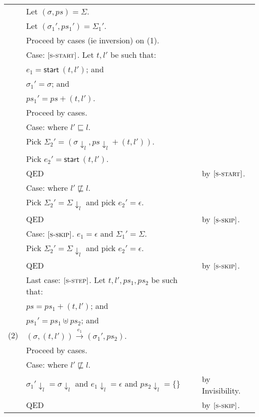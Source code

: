 \documentclass{article}
\newcommand{\rn}[1]{\text{\textsc{[#1]}}}
\newcommand{\tsteparrow}[1]{\overset{#1}{\longrightarrow}}
\newcommand{\tstep}[3]{#2\tsteparrow{#1}#3}
\newcommand{\process}[2]{(#1,#2)}
\newcommand{\evstart}[1]{\textsf{start}~#1}
\newcommand{\proj}[2]{#1{\downarrow_{#2}}}
\begin{document}
\begin{tabular}{l@{$\qquad$}l@{$\qquad$}l}
        & Let $(\sigma, ps) = \Sigma$.
\\
        & Let $(\sigma_1', ps_1') = \Sigma_1'$.
\\
        & Proceed by cases (ie inversion) on (1).
\\
        & Case: $\rn{s-start}$. Let $t,l'$ be such that:
\\
        & \z $e_1=\evstart{\process{t}{l'}}$; and
\\
        & \z $\sigma_1'=\sigma$; and
\\
        & \z $ps_1'=ps+\process{t}{l'}$.
\\
        & \z Proceed by cases.
\\
        & \z Case: where $l'\sqsubseteq l$.
\\
        & \z \z Pick $\Sigma_2' = {(\proj{\sigma}{l},\proj{ps}{l}+\process{t}{l'})}$.
\\
        & \z \z Pick $e_2' = {\evstart{\process{t}{l'}}}$.
\\
        & \z \z QED
        & by  $\rn{s-start}$.
\\
       & \z Case: where $l'\not\sqsubseteq l$.
\\
        & \z \z Pick $\Sigma_2' = \proj{\Sigma}{l}$ and pick $e_2' = \epsilon$.
\\
        & \z \z QED
        & by  $\rn{s-skip}$.
\\
        & Case: $\rn{s-skip}$. $e_1=\epsilon$ and $\Sigma_1'=\Sigma$.
\\
        & \z Pick $\Sigma_2' = \proj{\Sigma}{l}$ and pick $e_2' = \epsilon$.
\\
        & \z QED
        & by  $\rn{s-skip}$.
\\
        & Last case: $\rn{s-step}$. Let $t,l',ps_1,ps_2$ be such that:
\\
        & $ps=ps_1+\process{t}{l'}$; and
\\
        & $ps_1'=ps_1\uplus ps_2$; and
\\
  (2)   & $\tstep{e_1}{(\sigma,\process{t}{l'})}{(\sigma_1',ps_2)}$.
\\
        & Proceed by cases.
\\
        & Case: where $l'\not\sqsubseteq l$.
\\
        & \z $\proj{\sigma_1'}{l}=\proj{\sigma}{l}$ and $\proj{e_1}{l}=\epsilon$ and $\proj{ps_2}{l}=\{\}$
        & by Invisibility.
\\
        & \z QED
        & by $\rn{s-skip}$.
\\

\end{tabular}
\end{document}
